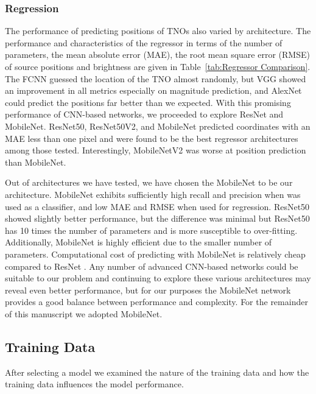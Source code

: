 \documentclass{aastex631}
\begin{document}
\subsubsection{Regression} \label{subsubsect:FixedDataRgs}

The performance of predicting positions of TNOs also varied by architecture.
The performance and characteristics of the regressor in terms of the number of parameters, the mean absolute error (MAE), the root mean square error (RMSE) of source positions and brightness are given in Table~\ref{tab:Regressor Comparison}.
The FCNN guessed the location of the TNO almost randomly, but VGG showed an improvement in all metrics especially on magnitude prediction, and AlexNet could predict the positions far better than we expected.
With this promising performance of CNN-based networks, we proceeded to explore ResNet and MobileNet.
ResNet50, ResNet50V2, and MobileNet predicted coordinates with an MAE less than one pixel and were found to be the best regressor architectures among those tested.
Interestingly, MobileNetV2 was worse at position prediction than MobileNet.

Out of architectures we have tested, we have chosen the MobileNet to be our architecture. 
MobileNet exhibits sufficiently high recall and precision when was used as a classifier, and low MAE and RMSE when used for regression. 
ResNet50 showed slightly better performance, but the difference was minimal but ResNet50 has 10 times the number of parameters and is more susceptible to over-fitting.
Additionally, MobileNet is highly efficient due to the smaller number of parameters.
Computational cost of predicting with MobileNet is relatively cheap compared to ResNet \citep{2020arXiv201108367S}.
Any number of advanced CNN-based networks could be suitable to our problem and continuing to explore these various architectures may reveal even better performance, but for our purposes the MobileNet network provides a good balance between performance and complexity.
For the remainder of this manuscript we adopted MobileNet. 

 \subsection{Training Data}
 \label{subsect:FixedArch}
 
After selecting a model we examined the nature of the training data and how the training data influences the model performance.
\end{document}
